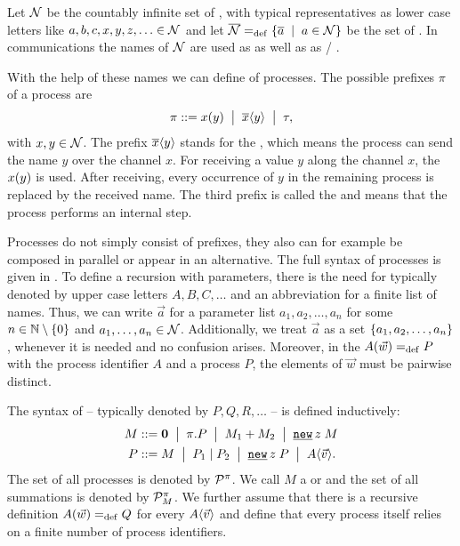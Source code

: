 Let $\mathcal N$ be the countably infinite set of , with typical representatives as lower case letters like $a,b,c,x,y,z,\ldots\in\mathcal N$ and let $\conames\define\set[a\in\names]{\overline{a}}$ be the set of . In communications the names of $\mathcal N$ are used as  as well as as  / .

With the help of these names we can define  of \picalc{} processes. The possible prefixes $\pi$ of a \picalc{} process are
\[\pi ::= x(y) \;\bigm|\; \overline{x}\langle y\rangle \;\bigm|\; \tau,\]
with $x,y\in\mathcal N$. The prefix $\overline{x}\langle y\rangle$ stands for the , which means the process can send the name $y$ over the channel $x$. For receiving a value $y$ along the channel $x$, the  $x(y)$ is used. After receiving, every occurrence of $y$ in the remaining process is replaced by the received name. The third prefix is called the  and means that the process performs an internal step.

Processes do not simply consist of prefixes, they also can for example be composed in parallel or appear in an alternative. The full syntax of \picalc{} processes is given in . To define a recursion with parameters, there is the need for  typically denoted by upper case letters $A,B,C,\ldots$ and an abbreviation for a finite list of names. Thus, we can write $\vec{a}$ for a parameter list $a_1,a_2,\ldots,a_n$ for some $n\in\N\setminus\set{0}$ and $a_1,\ldots,a_n\in\mathcal N$. Additionally, we treat $\vec{a}$ as a set $\set{a_1,a_2,\ldots,a_n}$, whenever it is needed and no confusion arises. Moreover, in the  $A(\vec{w})=_{\mathrm{def}}{}P$ with the process identifier $A$ and a process $P$, the elements of $\vec{w}$ must be pairwise distinct.

\begin{definition}[Syntax]
\label{def_syntax}
The syntax of \picalc{}  -- typically denoted by $P,Q,R,\ldots$ -- is defined inductively: 
\begin{align*}
 M & \syntdef \proczero \ebnf \pi.P \ebnf \procchoice{M_1}{M_2} \ebnf \procres{z}{M} \\
 P & \syntdef M \ebnf \procpar{P_1}{P_2} \ebnf \procres{z}{P} \ebnf \proccall{A}{\vec{v}}.
\end{align*}
The set of all \picalc{} processes is denoted by $\mathcal P^{\pi}$. We call $M$ a  or  and the set of all summations is denoted by $\mathcal P^{\pi}_{M}$. We further assume that there is a recursive definition $A(\vec{w})=_{\mathrm{def}}{}Q$ for every $A\langle\vec{v}\rangle$ and define that every process itself relies on a finite number of process identifiers.
\end{definition}

